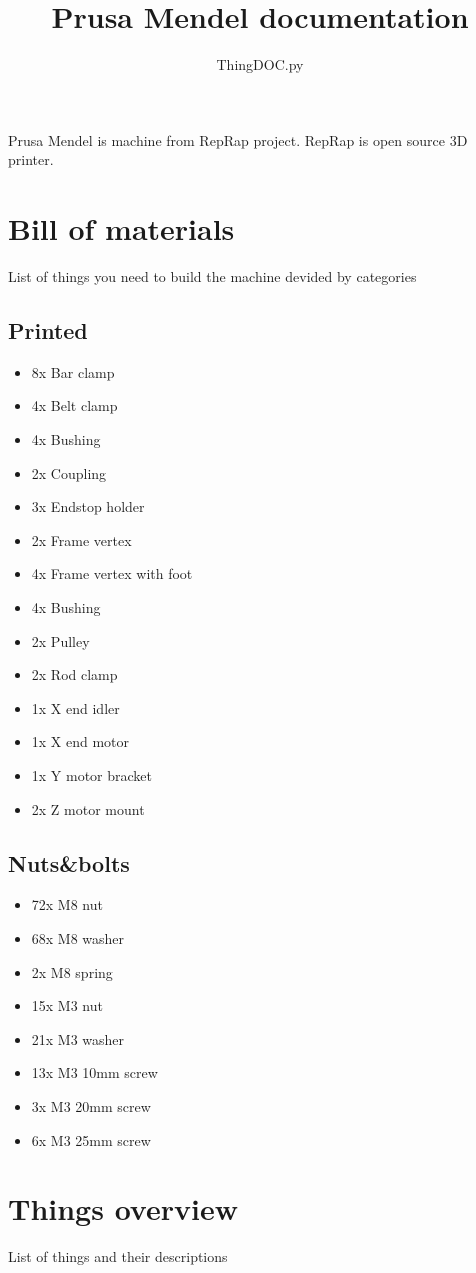 \documentclass[11pt]{article}
\title{Prusa Mendel documentation}
\author{ThingDOC.py}
\begin{document}
\maketitle
Prusa Mendel is machine from RepRap project. RepRap is open source 3D printer.
\newpage
\tableofcontents
\newpage
\section{Bill of materials}
List of things you need to build the machine devided by categories
\subsection{Printed}
\begin{itemize}
\item 8x Bar clamp
\item 4x Belt clamp
\item 4x Bushing
\item 2x Coupling
\item 3x Endstop holder
\item 2x Frame vertex
\item 4x Frame vertex with foot
\item 4x Bushing
\item 2x Pulley
\item 2x Rod clamp
\item 1x X end idler
\item 1x X end motor
\item 1x Y motor bracket
\item 2x Z motor mount
\end{itemize}
\subsection{Nuts\&bolts}
\begin{itemize}
\item 72x M8 nut
\item 68x M8 washer
\item 2x M8 spring
\item 15x M3 nut
\item 21x M3 washer
\item 13x M3 10mm screw
\item 3x M3 20mm screw
\item 6x M3 25mm screw
\end{itemize}
\newpage
\section{Things overview}
List of things and their descriptions
\end{document}
